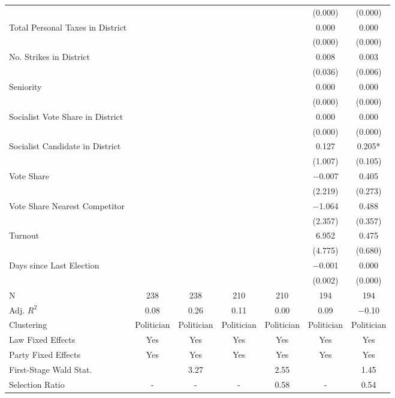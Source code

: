\begin{table}[!h]
{\begin{threeparttable}
\begin{tabular}[t]{lcccccc}
 &  &  &  &  & (\num{0.000}) & \vphantom{3} (\num{0.000})\\
Total Personal Taxes in District &  &  &  &  & \num{0.000} & \num{0.000}\\
 &  &  &  &  & (\num{0.000}) & \vphantom{2} (\num{0.000})\\
No. Strikes in District &  &  &  &  & \num{0.008} & \num{0.003}\\
 &  &  &  &  & (\num{0.036}) & (\num{0.006})\\
Seniority &  &  &  &  & \num{0.000} & \num{0.000}\\
 &  &  &  &  & (\num{0.000}) & \vphantom{1} (\num{0.000})\\
Socialist Vote Share in District &  &  &  &  & \num{0.000} & \num{0.000}\\
 &  &  &  &  & (\num{0.000}) & (\num{0.000})\\
Socialist Candidate in District &  &  &  &  & \num{0.127} & \num{0.205}*\\
 &  &  &  &  & (\num{1.007}) & (\num{0.105})\\
Vote Share &  &  &  &  & \num{-0.007} & \num{0.405}\\
 &  &  &  &  & (\num{2.219}) & (\num{0.273})\\
Vote Share Nearest Competitor &  &  &  &  & \num{-1.064} & \num{0.488}\\
 &  &  &  &  & (\num{2.357}) & (\num{0.357})\\
Turnout &  &  &  &  & \num{6.952} & \num{0.475}\\
 &  &  &  &  & (\num{4.775}) & (\num{0.680})\\
Days since Last Election &  &  &  &  & \num{-0.001} & \num{0.000}\\
 &  &  &  &  & (\num{0.002}) & (\num{0.000})\\
\midrule
N & \num{238} & \num{238} & \num{210} & \num{210} & \num{194} & \num{194}\\
Adj. $R^2$ & \num{0.08} & \num{0.26} & \num{0.11} & \num{0.00} & \num{0.09} & \num{-0.10}\\
Clustering & Politician & Politician & Politician & Politician & Politician & Politician\\
Law Fixed Effects & Yes & Yes & Yes & Yes & Yes & Yes\\
Party Fixed Effects & Yes & Yes & Yes & Yes & Yes & Yes\\
First-Stage Wald Stat. &  & 3.27 &  & 2.55 &  & 1.45\\
Selection Ratio & - & - & - & 0.58 & - & 0.54\\

\end{tabular}
\end{threeparttable}}
\end{table}
